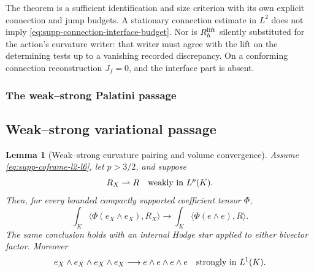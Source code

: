 \documentclass[11pt]{article}
\numberwithin{equation}{section}
\newtheorem{lemma}[lemma]{Lemma}
\theoremstyle{definition}
\theoremstyle{remark}
\begin{document}
The theorem is a sufficient identification and size criterion with its own
explicit connection and jump budgets.  A stationary connection estimate in
$L^2$ does not imply \eqref{eq:supp-connection-interface-budget}.
Nor is $R_h^{\rm lift}$ silently substituted for the action's curvature
writer: that writer must agree with the lift on the determining tests up to
a vanishing recorded discrepancy.  On a conforming connection reconstruction
$J_f=0$, and the interface part is absent.

\subsubsection{The weak--strong Palatini passage}

\subsection{Weak--strong variational passage}

\begin{lemma}[Weak--strong curvature pairing and volume convergence]
\label{lem:supp-weak-strong-palatini}
Assume \eqref{eq:supp-coframe-l2-l6}, let $p>3/2$, and suppose
\begin{equation}
 R_X\rightharpoonup R\quad\hbox{weakly in }L^p(K).
 \label{eq:supp-curvature-weak}
\end{equation}
Then, for every bounded compactly supported coefficient tensor $\Phi$,
\begin{equation}
 \int_K\!\langle\Phi(e_X\wedge e_X),R_X\rangle
 \longrightarrow
 \int_K\!\langle\Phi(e\wedge e),R\rangle.
 \label{eq:supp-weak-strong-pairing}
\end{equation}
The same conclusion holds with an internal Hodge star applied to either
bivector factor.  Moreover
\begin{equation}
 e_X\wedge e_X\wedge e_X\wedge e_X
 \longrightarrow
 e\wedge e\wedge e\wedge e
 \quad\hbox{strongly in }L^1(K).
 \label{eq:supp-volume-strong}
\end{equation}
\end{lemma}
\end{document}
